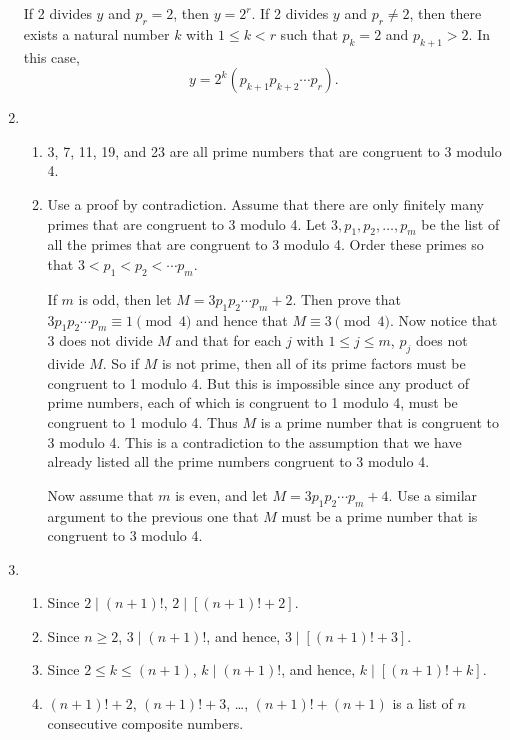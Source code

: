 \begin{enumerate}
If 2 divides $y$ and $p_r = 2$, then $y = 2^r$.  If 2 divides $y$ and $p_r \ne 2$, then there exists a natural number $k$ with $1 \leq k < r$ such that $p_k = 2$ and $p_{k+1}>2$.  In this case,
\[
y = 2^k \left( p_{k+1} p_{k+2} \cdots p_r \right).
\]

\item \begin{enumerate}
\item 3, 7, 11, 19, and 23 are all prime numbers that are congruent to 3 modulo 4.

\item Use a proof by contradiction.  Assume that there are only finitely many primes that are congruent to 3 modulo 4.  Let $3, p_1, p_2, \ldots, p_m$ be the list of all the primes that are congruent to 3 modulo 4.  Order these primes so that $3 < p_1 < p_2 < \cdots p_m$.

If $m$ is odd, then let $M = 3 p_1 p_2 \cdots p_m + 2$.  Then prove that 
$3 p_1 p_2 \cdots p_m \equiv 1 \pmod 4$ and hence that $M \equiv 3 \pmod 4$.  Now notice that 3 does not divide $M$ and that for each $j$ with $1 \leq j \leq m$, $p_j$ does not divide 
$M$.  So if $M$ is not prime, then all of its prime factors must be congruent to 1 modulo 4.  But this is impossible since any product of prime numbers, each of which is congruent to 1 modulo 4, must be congruent to 1 modulo 4.  Thus $M$ is a prime number that is congruent to 3 modulo 4.  This is a contradiction to the assumption that we have already listed all the prime numbers congruent to 3 modulo 4.

Now assume that $m$ is even, and let $M =3 p_1 p_2 \cdots p_m + 4$.  Use a similar argument to the previous one that $M$ must be a prime number that is congruent to 3 modulo 4.
\end{enumerate}

\item \begin{enumerate}
\item Since $2 \mid \left( n + 1 \right)!$, $2 \mid \left[\left( n + 1 \right)! + 2 \right]$.

\item Since $n \geq 2$, $3 \mid \left( n + 1 \right)!$, and hence, 
$3 \mid \left[\left( n + 1 \right)! + 3 \right]$.

\item Since $2 \leq k \leq \left( n + 1 \right)$, $k \mid \left( n + 1 \right)!$, and hence, 
$k \mid \left[\left( n + 1 \right)! + k \right]$.

\item $\left( n + 1 \right)! + 2$, $\left( n + 1 \right)! + 3$, \ldots,  
$\left( n + 1 \right)! + \left( n + 1 \right)$ is a list of $n$ consecutive composite numbers.
\end{enumerate}


\end{enumerate}
